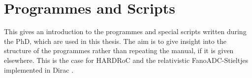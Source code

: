 \chapter{Programmes and Scripts}
\label{app:programmes}

This gives an introduction to the programmes and special scripts
written during the PhD, which are used in this thesis. The aim is
to give insight into the structure of the programmes rather than repeating
the manual, if it is given elsewhere. This is the case for HARDRoC
\cite{HARDRoC} and the relativistic FanoADC-Stieltjes implemented in Dirac
\cite{DIRAC13}.





